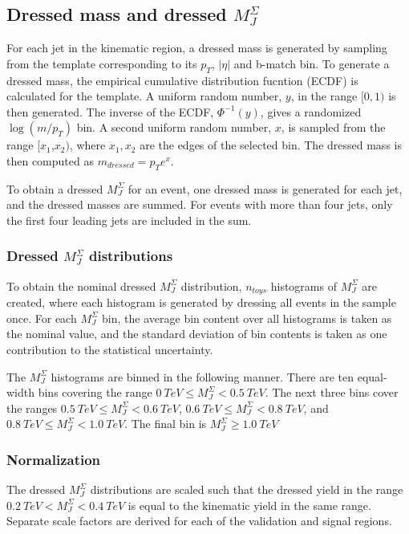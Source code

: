 \subsection{Dressed mass and dressed $M_{J}^{\Sigma}$}
For each jet in the kinematic region, a dressed mass is generated by sampling from
the template corresponding to its $p_T$, $|\eta|$ and b-match bin. To
generate a dressed mass, the empirical cumulative distribution fucntion (ECDF)
is calculated for the template. A uniform random number, $y$, in the
range $[0,1)$ is then
generated. The inverse of the ECDF, $\Phi^{-1}(y)$, gives a randomized
$\log\left(m/p_T\right)$ bin. A second uniform random number, $x$, is sampled from the range
$[x_1$,$x_2)$, where $x_1,x_2$ are the edges of the selected bin. The
dressed mass is then computed as $m_{dressed} = p_{T}e^x$.

To obtain a dressed $M_{J}^{\Sigma}$ for an event, one dressed mass is
generated for each jet, and the dressed masses are summed. For
events with more than four jets, only the first four leading jets are
included in the sum.

\subsubsection{Dressed $M_{J}^{\Sigma}$ distributions}
To obtain the nominal dressed $M_{J}^{\Sigma}$ distribution,
$n_{toys}$ histograms of $M_{J}^{\Sigma}$ are created, where each
histogram is generated by dressing all events in the sample once. For
each $M_{J}^{\Sigma}$ bin, the average bin content over all histograms is taken
as the nominal value, and the standard deviation of bin contents is
taken as one contribution to the statistical uncertainty.

The $M_{J}^{\Sigma}$ histograms are binned in the following
manner. There are ten equal-width bins covering the range $0~TeV \leq M_{J}^{\Sigma} <
0.5~TeV$. The next three bins cover the ranges $0.5~TeV \leq M_{J}^{\Sigma} <
0.6~TeV$, $0.6~TeV \leq M_{J}^{\Sigma} <
0.8~TeV$, and $0.8~TeV \leq M_{J}^{\Sigma} <
1.0~TeV$. The final bin is $M_{J}^{\Sigma} \geq
1.0~TeV$

\subsubsection{Normalization}
The dressed $M_{J}^{\Sigma}$ distributions are scaled such that the
dressed yield in the range  $0.2~TeV < M_{J}^{\Sigma} <
0.4~TeV$ is equal to the kinematic yield in the same range. Separate
scale factors are derived for each of the validation and signal regions.

